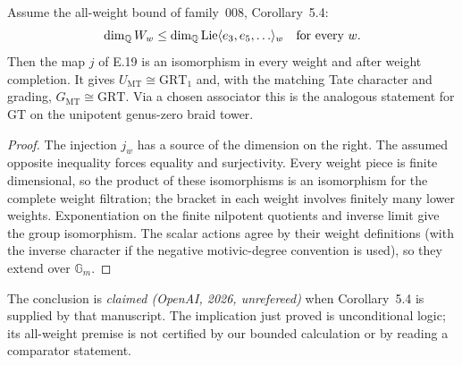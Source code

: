 Assume the all-weight bound of family~008, Corollary~5.4:
\[
 \dim_{\mathbb Q} W_w\leq
 \dim_{\mathbb Q}\operatorname{Lie}\langle e_3,e_5,\ldots\rangle_w
 \quad\hbox{for every }w.
\]
Then the map $j$ of E.19 is an isomorphism in every weight and after
weight completion.  It gives
$U_{\mathrm{MT}}\cong\mathrm{GRT}_1$ and, with the matching Tate
character and grading, $G_{\mathrm{MT}}\cong\mathrm{GRT}$.
Via a chosen associator this is the analogous statement for
$\mathrm{GT}$ on the unipotent genus-zero braid tower.
\begin{proof}
The injection $j_w$ has a source of the dimension on the right.
The assumed opposite inequality forces equality and surjectivity.
Every weight piece is finite dimensional, so the product of these
isomorphisms is an isomorphism for the complete weight filtration;
the bracket in each weight involves finitely many lower weights.
Exponentiation on the finite nilpotent quotients and inverse limit
give the group isomorphism.  The scalar actions agree by their weight
definitions (with the inverse character if the negative motivic-degree
convention is used), so they extend over $\mathbb G_m$.
\end{proof}
The conclusion is \emph{claimed (OpenAI, 2026, unrefereed)} when
Corollary~5.4 is supplied by that manuscript.  The implication just
proved is unconditional logic; its all-weight premise is not certified
by our bounded calculation or by reading a comparator statement.


